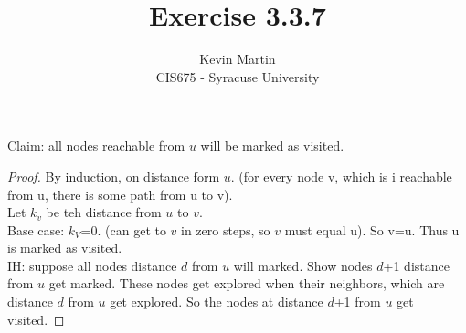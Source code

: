 \documentclass{article}
\author{Kevin Martin\\ CIS675 - Syracuse University}
\title{Exercise 3.3.7}
\begin{document}
\maketitle
Claim: all nodes reachable from $u$ will be marked as visited.
\begin{proof} By induction, on distance form $u$. (for every node v, which is i
  reachable from u, there is some path from u to v).\\
  Let $k_{v}$ be teh distance from $u$ to $v$.\\
  Base case: $k_{V}$=0. (can get to $v$ in zero steps, so $v$ must equal u). So v=u.
  Thus u is marked as visited.\\
  IH: suppose all nodes distance $d$ from $u$ will marked. Show nodes $d$+1 distance
  from $u$ get marked. These nodes get explored when their neighbors, which are
  distance $d$ from $u$ get explored. So the nodes at distance $d$+1 from $u$
  get visited. 
\end{proof}
\end{document}
